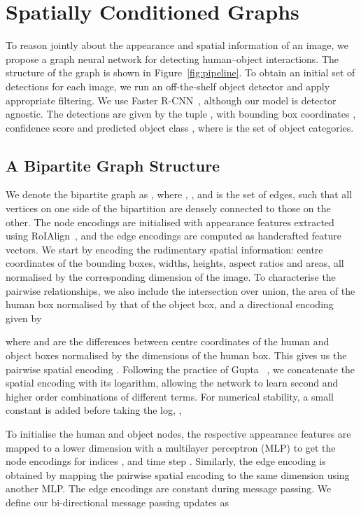 \documentclass[10pt,twocolumn,letterpaper]{article}
\begin{document}
\section{Spatially Conditioned Graphs}

To reason jointly about the appearance and spatial information of an image, we propose a graph neural network for detecting human--object interactions.
The structure of the graph is shown in Figure~\ref{fig:pipeline}. To obtain an initial set of detections  for each image, we run an off-the-shelf object detector and apply appropriate filtering. We use Faster R-CNN~\cite{ren2015}, although our model is detector agnostic. The detections are given by the tuple , with bounding box coordinates , confidence score  and predicted object class , where  is the set of object categories.

\subsection{A Bipartite Graph Structure}

We denote the bipartite graph as , where , , and  is the set of edges, such that all vertices on one side of the bipartition are densely connected to those on the other. The node encodings are initialised with appearance features extracted using RoIAlign~\cite{he2017}, and the edge encodings are computed as handcrafted feature vectors. We start by encoding the rudimentary spatial information: centre coordinates of the bounding boxes, widths, heights, aspect ratios and areas, all normalised by the corresponding dimension of the image. To characterise the pairwise relationships, we also include the intersection over union, the area of the human box normalised by that of the object box, and a directional encoding given by

where  and  are the differences between centre coordinates of the human and object boxes normalised by the dimensions of the human box. This gives us the pairwise spatial encoding . Following the practice of Gupta \etal~\cite{gupta2019}, we concatenate the spatial encoding with its logarithm, allowing the network to learn second and higher order combinations of different terms. For numerical stability, a small constant  is added before taking the log, \ie,


To initialise the human and object nodes, the respective appearance features are mapped to a lower dimension with a multilayer perceptron (MLP) to get the node encodings  for indices ,  and time step .
Similarly, the edge encoding  is obtained by mapping the pairwise spatial encoding to the same dimension using another MLP. The edge encodings are constant during message passing. We define our bi-directional message passing updates as
\end{document}
